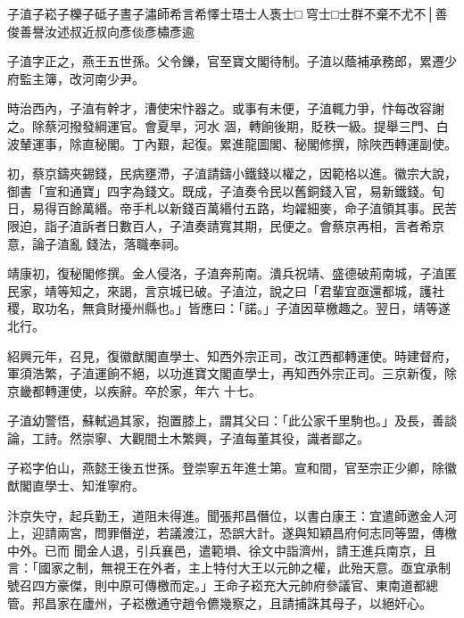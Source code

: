 
\begin{pinyinscope}

 子淔子崧子櫟子砥子晝子潚師希言希懌士珸士人褭士□
 穹士□士群不棄不尤不│善俊善譽汝述叔近叔向彥倓彥橚彥逾



 子淔字正之，燕王五世孫。父令鑠，官至寶文閣待制。子淔以蔭補承務郎，累遷少府監主簿，改河南少尹。



 時治西內，子淔有幹才，漕使宋忭器之。或事有未便，子淔輒力爭，忭每改容謝之。除蔡河撥發綱運官。會夏旱，河水
 涸，轉餉後期，貶秩一級。提舉三門、白波輦運事，除直秘閣。丁內艱，起復。累進龍圖閣、秘閣修撰，除陜西轉運副使。



 初，蔡京鑄夾錫錢，民病壅滯，子淔請鑄小鐵錢以權之，因範格以進。徽宗大說，御書「宣和通寶」四字為錢文。既成，子淔奏令民以舊銅錢入官，易新鐵錢。旬日，易得百餘萬緡。帝手札以新錢百萬緡付五路，均糴細麥，命子淔領其事。民苦限迫，詣子淔訴者日數百人，子淔奏請寬其期，民便之。會蔡京再相，言者希京意，論子淔亂
 錢法，落職奉祠。



 靖康初，復秘閣修撰。金人侵洛，子淔奔荊南。潰兵祝靖、盛德破荊南城，子淔匿民家，靖等知之，來謁，言京城已破。子淔泣，說之曰「君輩宜亟還都城，護社稷，取功名，無貪財擾州縣也。」皆應曰：「諾。」子淔因草檄趣之。翌日，靖等遂北行。



 紹興元年，召見，復徽猷閣直學士、知西外宗正司，改江西都轉運使。時建督府，軍須浩繁，子淔運餉不絕，以功進寶文閣直學士，再知西外宗正司。三京新復，除京畿都轉運使，以疾辭。卒於家，年六
 十七。



 子淔幼警悟，蘇軾過其家，抱置膝上，謂其父曰：「此公家千里駒也。」及長，善談論，工詩。然崇寧、大觀間土木繁興，子淔每董其役，識者鄙之。



 子崧字伯山，燕懿王後五世孫。登崇寧五年進士第。宣和間，官至宗正少卿，除徽猷閣直學士、知淮寧府。



 汴京失守，起兵勤王，道阻未得進。聞張邦昌僭位，以書白康王：宜遣師邀金人河上，迎請兩宮，問罪僭逆，若議渡江，恐誤大計。遂與知穎昌府何志同等盟，傳檄中外。已而
 聞金人退，引兵襄邑，遣範塤、徐文中詣濟州，請王進兵南京，且言：「國家之制，無視王在外者，主上特付大王以元帥之權，此殆天意。亟宜承制號召四方豪傑，則中原可傳檄而定。」王命子崧充大元帥府參議官、東南道都總管。邦昌家在廬州，子崧檄通守趙令儦幾察之，且請捕誅其母子，以絕奸心。




\end{pinyinscope}
